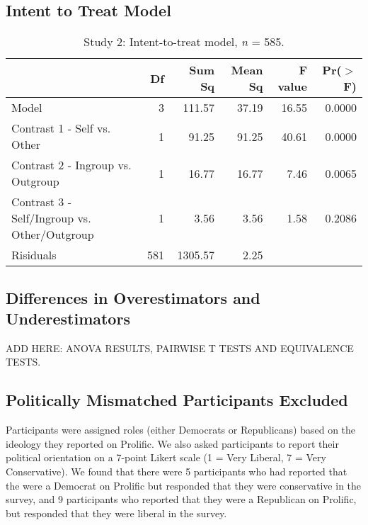 \documentclass[12pt,]{article}
\begin{document}

\subsection{Intent to Treat Model}
\label{appendix:itt2}


\begin{table}[ht]
\centering
\begin{tabular}{lrrrrr}
  \hline
 & Df & Sum Sq & Mean Sq & F value & Pr($>$F) \\ 
  \hline
Model & 3 & 111.57 & 37.19 & 16.55 & 0.0000 \\ 
  Contrast 1 - Self vs. Other & 1 & 91.25 & 91.25 & 40.61 & 0.0000 \\ 
  Contrast 2 - Ingroup vs. Outgroup & 1 & 16.77 & 16.77 & 7.46 & 0.0065 \\ 
  Contrast 3 - Self/Ingroup vs. Other/Outgroup & 1 & 3.56 & 3.56 & 1.58 & 0.2086 \\ 
  Risiduals & 581 & 1305.57 & 2.25 &  &  \\ 
   \hline
\end{tabular}
\caption{Study 2: Intent-to-treat model, \emph{n} = 585. } 
\label{ITT2}
\end{table}



\clearpage
\subsection{Differences in Overestimators and Underestimators}
\label{appendix:over_under2}


ADD HERE: ANOVA RESULTS, PAIRWISE T TESTS AND EQUIVALENCE TESTS. 




\newpage
\subsection{Politically Mismatched Participants Excluded}
\label{appendix:mismatch}

Participants were assigned roles (either Democrats or Republicans) based on the ideology they reported on Prolific. We also asked participants to report their political orientation on a 7-point Likert scale (1 = Very Liberal, 7 = Very Conservative). We found that there were 5 participants who had reported that the were a Democrat on Prolific but responded that they were conservative in the survey, and 9 participants who reported that they were a Republican on Prolific, but responded that they were liberal in the survey. 
\end{document}
